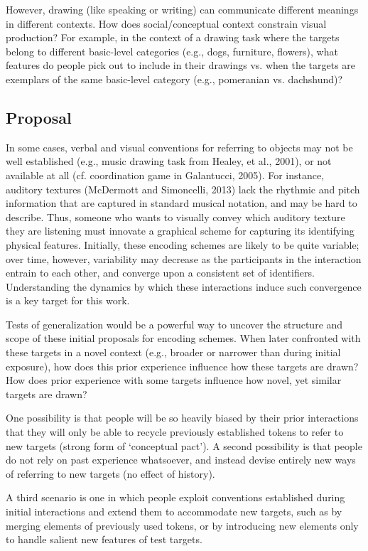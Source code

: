 \documentclass[12pt]{article}
\begin{document}
However, drawing (like speaking or writing) can communicate different meanings in different contexts. How does social/conceptual context constrain visual production? For example, in the context of a drawing task where the targets belong to different basic-level categories (e.g., dogs, furniture, flowers), what features do people pick out to include in their drawings vs. when the targets are exemplars of the same basic-level category (e.g., pomeranian vs. dachshund)? 


\subsection{Proposal}

In some cases, verbal and visual conventions for referring to objects may not be well established (e.g., music drawing task from Healey, et al., 2001), or not available at all (cf. coordination game in Galantucci, 2005). For instance, auditory textures (McDermott and Simoncelli, 2013) lack the rhythmic and pitch information that are captured in standard musical notation, and may be hard to describe. Thus, someone who wants to visually convey which auditory texture they are listening must innovate a graphical scheme for capturing its identifying physical features. Initially, these encoding schemes are likely to be quite variable; over time, however, variability may decrease as the participants in the interaction entrain to each other, and converge upon a consistent set of identifiers. Understanding the dynamics by which these interactions induce such convergence is a key target for this work. 

Tests of generalization would be a powerful way to uncover the structure and scope of these initial proposals for encoding schemes. When later confronted with these targets in a novel context (e.g., broader or narrower than during initial exposure), how does this prior experience influence how these targets are drawn? How does prior experience with some targets influence how novel, yet similar targets are drawn?

One possibility is that people will be so heavily biased by their prior interactions that they will only be able to recycle previously established tokens to refer to new targets (strong form of `conceptual pact'). A second possibility is that people do not rely on past experience whatsoever, and instead devise entirely new ways of referring to new targets (no effect of history). 

A third scenario is one in which people exploit conventions established during initial interactions and extend them to accommodate new targets, such as by merging elements of previously used tokens, or by introducing new elements only to handle salient new features of test targets. 
\end{document}
